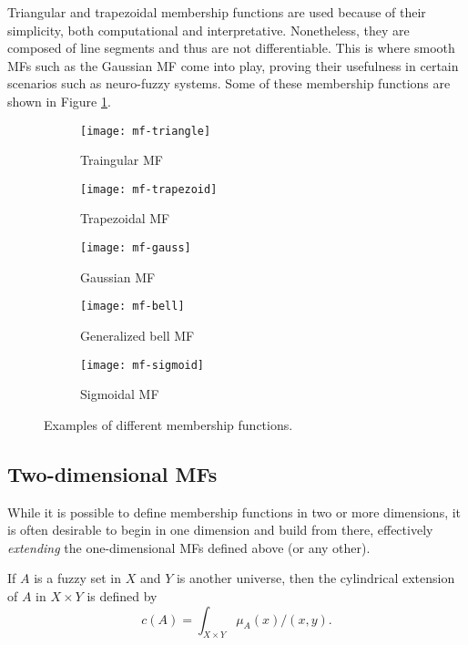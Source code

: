 Triangular and trapezoidal membership functions are used because of their simplicity, both computational and interpretative. Nonetheless, they are composed of line segments and thus are not differentiable. This is where smooth MFs such as the Gaussian MF come into play, proving their usefulness in certain scenarios such as neuro-fuzzy systems. Some of these membership functions are shown in Figure \ref{fig:mfs}.


\begin{figure}[h!]
    \centering
    \begin{subfigure}[b]{0.4\textwidth}
        \texttt{[image: mf-triangle]}
        \caption{Traingular MF}
    \end{subfigure}
    \begin{subfigure}[b]{0.4\textwidth}
        \texttt{[image: mf-trapezoid]}
        \caption{Trapezoidal MF}
    \end{subfigure}
    \begin{subfigure}[b]{0.4\textwidth}
        \texttt{[image: mf-gauss]}
        \caption{Gaussian MF}
    \end{subfigure}
    \begin{subfigure}[b]{0.4\textwidth}
        \texttt{[image: mf-bell]}
        \caption{Generalized bell MF}
    \end{subfigure}
    \begin{subfigure}[b]{0.4\textwidth}
        \vspace{.5em}
        \texttt{[image: mf-sigmoid]}
        \caption{Sigmoidal MF}
    \end{subfigure}
    \caption{Examples of different membership functions.}
    \label{fig:mfs}
\end{figure}


\subsection{Two-dimensional MFs}

While it is possible to define membership functions in two or more dimensions, it is often desirable to begin in one dimension and build from there, effectively \textit{extending} the one-dimensional MFs defined above (or any other).

\begin{definition} If $A$ is a fuzzy set in $X$ and $Y$ is another universe, then the cylindrical extension of $A$ in $X \times Y$ is defined by
\[
c(A) = \int_{X\times Y} \mu_A(x) \slash (x,y).
\]

\end{definition}

